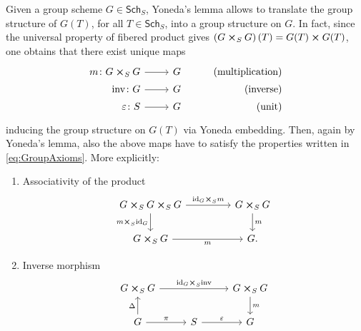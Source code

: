\begin{rem}[]\label{rem:StructuralMorphisms}
	Given a group scheme $G \in \mathsf{Sch}_{ S }$, Yoneda's lemma allows to translate
	the group structure of $G(T)$, for all $T \in \mathsf{Sch}_{ S }$, into a group structure on $G$.
	In fact, since the universal property of
	fibered product gives $\left( G \cross_{ S } G \right)(T) = G(T) \cross G(T)$,
	one obtains that there exist unique maps
	\begin{equation*}
			\begin{tikzcd}[row sep = 0ex
         ,/tikz/column 1/.append style={anchor=base east}
         ,/tikz/column 2/.append style={anchor=base west}
         ,/tikz/column 3/.append style={anchor=base east}]
			m\colon G \cross_{ S } G \arrow[r, "", rightarrow] &
			G & \text{(multiplication)} \\
			\mathrm{inv}\colon G \arrow[r, "", rightarrow] &
			G & \text{(inverse)} \\
			\varepsilon \colon S \arrow[r, "", rightarrow] &
			G & \text{(unit)} 
		\end{tikzcd}
	\end{equation*} 
	inducing the group structure on $G(T)$ via Yoneda embedding.
	Then, again by Yoneda's lemma, also the above maps have to
	satisfy the properties written in 
	\cref{eq:GroupAxioms}.
	More explicitly:
	\begin{enumerate}
		\item Associativity of the product
			\begin{equation*}
			\begin{tikzcd}[column sep=4.5em]
				G \cross_{ S } G \cross_{ S } G 
				\arrow[r, "\mathrm{id}_{ G } \cross_S m", rightarrow] 
				\arrow[d, "m \cross_S \mathrm{id}_{ G }"', rightarrow] &
				G \cross_{ S } G \arrow[d, "m", rightarrow] \\
				G \cross_{ S } G \arrow[r, "m"', rightarrow] &
				G.
			\end{tikzcd}
			\end{equation*} 
		\item Inverse morphism 
			\begin{equation*}
			\begin{tikzcd}[column sep=2.7em]
				G \cross_{ S } G
				\arrow[rr, "\mathrm{id}_{ G } \cross_S \mathrm{inv}", rightarrow] & &
				G \cross_{ S } G \arrow[d, "m", rightarrow] \\
				G \arrow[u, "\Delta", rightarrow] 
				\arrow[r, "\pi", rightarrow] &
				S \arrow[r, "\varepsilon", rightarrow] & 
				G
			\end{tikzcd}

\end{equation*}
\end{enumerate}
\end{rem}
